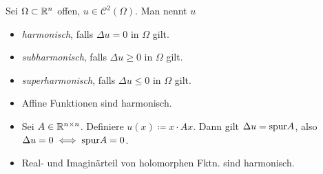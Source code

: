 \documentclass{cheat-sheet}
\newcommand{\dive}{\mathrm{div}} %
\begin{document}

\iffalse
  Physikalische Motivation/Herleitung

  Beschreibung von Gleichgewichtszuständen von physikalischen Zuständen $u$ (Temperatur / Konzentration)

  Gleichgewicht: "`Nettofluss"' durch den Rand $V \subset \Omega$:
  Jedes (glatt berandete) Testvolumen verschwindet.

  $F \coloneqq Flussdichte von $u

  $0 = \Int{\partial V}{}{F \circ \nu}{S} \overset{\text{Gauss}}{=} \Int{V}{}{\dive F}{x}$

  Es folgt: $\dive F = 0$, da $V$ beliebig

  Typischerweise $F = -a Du$ ($a > 0$).

  Es folgt: $-a \Delta u = 0$

  In der Physik: Diffusion von Feldern, 1. Ficksche Gesetz, Wärmeleitung, Fouriersches Gesetz

  Definition von harmonischen Funktionen und der Fundamentallösung
\fi

\begin{defn}
  Sei $\Omega \subset \mathbb{R}^n$ offen, $u \in \mathcal{C}^2(\Omega)$. Man nennt $u$
  \begin{itemize}
    \item \emph{harmonisch}, falls $\Delta u = 0$ in $\Omega$ gilt.
    \item \emph{subharmonisch}, falls $\Delta u \geq 0$ in $\Omega$ gilt.
    \item \emph{superharmonisch}, falls $\Delta u \leq 0$ in $\Omega$ gilt.
  \end{itemize}
\end{defn}

\begin{bspe}
  \begin{itemize}
    \item Affine Funktionen sind harmonisch.
    \item Sei $A \in \mathbb{R}^{n \times n}$. Definiere $u(x) \coloneqq x \cdot Ax$. Dann gilt $\Delta u = \mathrm{spur} A$, also $\Delta u = 0 \iff \mathrm{spur} A = 0$.
    \item Real- und Imaginärteil von holomorphen Fktn. sind harmonisch.
  \end{itemize}
\end{bspe}
\end{document}
